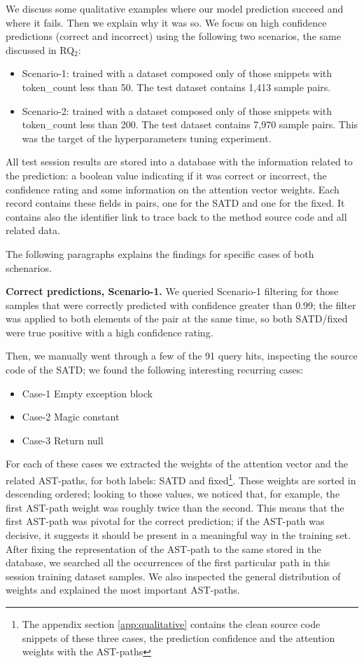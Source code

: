 We discuss some qualitative examples where our model prediction succeed and where it fails. Then we explain why it was so.
We focus on high confidence predictions (correct and incorrect) using the following two scenarios, the same discussed in RQ$_2$:
\begin{itemize}
    \item Scenario-1: trained with a dataset composed only of those snippets with token\_count less than 50. The test dataset contains 1,413 sample pairs.
    \item Scenario-2: trained with a dataset composed only of those snippets with token\_count less than 200. The test dataset contains 7,970 sample pairs. This was the target of the hyperparameters tuning experiment.
\end{itemize}

All test session results are stored into a database with the information related to the prediction: a boolean value indicating if it was correct or incorrect, the confidence rating and some information on the attention vector weights. Each record contains these fields in pairs, one for the SATD and one for the fixed. It contains also the identifier link to trace back to the method source code and all related data.

The following paragraphs explains the findings for specific cases of both schenarios.

\textbf{Correct predictions, Scenario-1.} We queried Scenario-1 filtering for those samples that were correctly predicted with confidence greater than 0.99; the filter was applied to both elements of the pair at the same time, so both SATD/fixed were true positive with a high confidence rating.

Then, we manually went through a few of the 91 query hits, inspecting the source code of the SATD; we found the following interesting recurring cases:
\begin{itemize}
    \item Case-1 Empty exception block %
    \item Case-2 Magic constant %
    \item Case-3 Return null %
\end{itemize}

For each of these cases we extracted the weights of the attention vector and the related AST-paths, for both labels: SATD and fixed\footnote{The appendix section \ref{app:qualitative} contains the clean source code snippets of these three cases, the prediction confidence and the attention weights with the AST-paths}. These weights are sorted in descending ordered; looking to those values, we noticed that, for example, the first AST-path weight was roughly twice than the second. This means that the first AST-path was pivotal for the correct prediction; if the AST-path was decisive, it suggests it should be present in a meaningful way in the training set. After fixing the representation of the AST-path to the same stored in the database, we searched all the occurrences of the first particular path in this session training dataset samples. We also inspected the general distribution of weights and explained the most important AST-paths.


